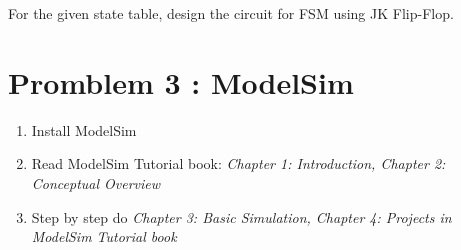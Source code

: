 \documentclass[12pt, letterpaper]{article}
\begin{document}
For the given state table, design the circuit for FSM using JK Flip-Flop.

\pagebreak
\section*{Promblem 3 : ModelSim}

\begin{enumerate}
    \item Install ModelSim
    \item Read ModelSim Tutorial book: \emph{Chapter 1: Introduction, Chapter 2: Conceptual Overview}
    \item Step by step do \emph{Chapter 3: Basic Simulation, Chapter 4: Projects in ModelSim Tutorial book}
\end{enumerate}
\end{document}
